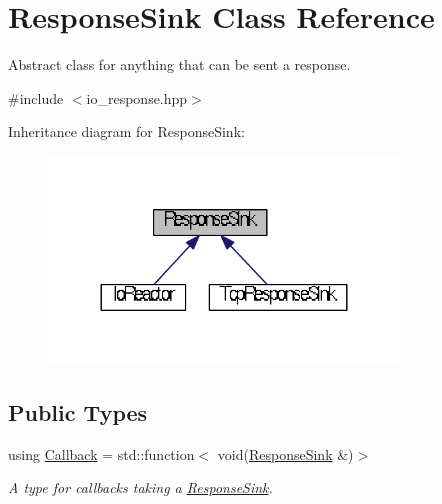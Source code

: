 \hypertarget{classResponseSink}{\section{Response\+Sink Class Reference}
\label{classResponseSink}
}


Abstract class for anything that can be sent a response.  




{\ttfamily \#include $<$io\+\_\+response.\+hpp$>$}



Inheritance diagram for Response\+Sink\+:
\nopagebreak
\begin{figure}[H]
\begin{center}
\leavevmode
\includegraphics[width=264pt]{classResponseSink__inherit__graph}
\end{center}
\end{figure}
\subsection*{Public Types}
\begin{DoxyCompactItemize}
\item 
\hypertarget{classResponseSink_a4a5be6c1c271b979d28388974ae86ad2}{using \hyperlink{classResponseSink_a4a5be6c1c271b979d28388974ae86ad2}{Callback} = std\+::function$<$ void(\hyperlink{classResponseSink}{Response\+Sink} \&)$>$}\label{classResponseSink_a4a5be6c1c271b979d28388974ae86ad2}

\begin{DoxyCompactList}\small\item\em A type for callbacks taking a \hyperlink{classResponseSink}{Response\+Sink}. \end{DoxyCompactList}\end{DoxyCompactItemize}
